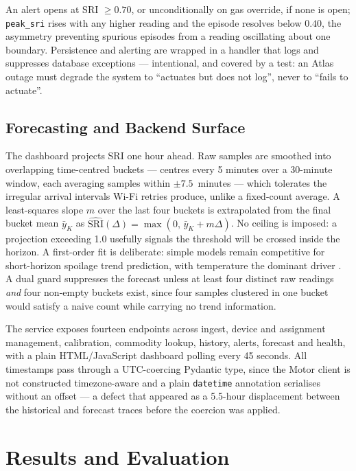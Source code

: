 \documentclass[conference]{IEEEtran}
\begin{document}
An alert opens at SRI $\ge 0.70$, or unconditionally on gas override, if
none is open; \texttt{peak\_sri} rises with any higher reading and the
episode resolves below $0.40$, the asymmetry preventing spurious episodes
from a reading oscillating about one boundary. Persistence and alerting
are wrapped in a handler that logs and suppresses database exceptions ---
intentional, and covered by a test: an Atlas outage must degrade the
system to ``actuates but does not log'', never to ``fails to actuate''.

\subsection{Forecasting and Backend Surface}

The dashboard projects SRI one hour ahead. Raw samples are smoothed into
overlapping time-centred buckets --- centres every 5 minutes over a
30-minute window, each averaging samples within $\pm7.5$~minutes --- which
tolerates the irregular arrival intervals Wi-Fi retries produce, unlike a
fixed-count average. A least-squares slope $m$ over the last four buckets
is extrapolated from the final bucket mean $\bar{y}_K$ as
$\widehat{\text{SRI}}(\Delta) = \max(0,\, \bar{y}_{K} + m\Delta)$. No
ceiling is imposed: a projection exceeding 1.0 usefully signals the
threshold will be crossed inside the horizon. A first-order fit is
deliberate: simple models remain competitive for short-horizon spoilage
trend prediction, with temperature the dominant driver
\cite{rbm2026}. A dual guard suppresses the
forecast unless at least four distinct raw readings \emph{and} four
non-empty buckets exist, since four samples clustered in one bucket would
satisfy a naive count while carrying no trend information.

The service exposes fourteen endpoints across ingest, device and
assignment management, calibration, commodity lookup, history, alerts,
forecast and health, with a plain HTML/JavaScript dashboard polling every
45 seconds. All timestamps pass through a UTC-coercing Pydantic type,
since the Motor client is not constructed timezone-aware and a plain
\texttt{datetime} annotation serialises without an offset --- a defect
that appeared as a 5.5-hour displacement between the historical and
forecast traces before the coercion was applied.

\section{Results and Evaluation}
\label{sec:results}
\end{document}
